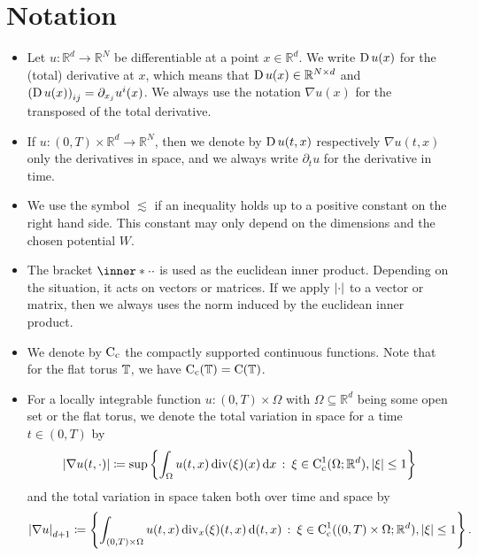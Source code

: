 \chapter{Notation}


	\begin{itemize}[leftmargin=*]
		\item	
		Let $ u \colon \mathbb{ R }^{ d } \to \mathbb{ R }^{ N } $ be 
		differentiable at a point $ x \in \mathbb{ R }^{d } $. We write $ \operatorname{D} 
		u ( x ) $ for the (total) derivative at $ x $, which means that
		$ \operatorname{D} u ( x ) \in \mathbb{ R }^{ N \times d } $ and
		$ \left( \operatorname{D} u ( x ) \right)_{ i j } = \partial_{ x_{ j } } u^{ i } ( 
		x ) $. We always use the notation $ \nabla u ( x ) $ for the transposed 
		of the total derivative. 
		
		\item
		If $ u \colon ( 0 , T ) \times \mathbb{ R }^{ d } \to \mathbb{ R 
		}^{ N } $, then we denote by $ \operatorname{D} u (t, x ) $  respectively $ \nabla 
		u ( 
		t,  x ) $ only the derivatives in space, and we always write $ 
		\partial_{ 
		t } u $ for the derivative in time.
	
		\item
		We use the symbol $ \lesssim $ if an inequality holds up to a positive 
		constant on the right hand side. This constant may only depend on the 
		dimensions and the chosen potential $ W $.
		
		\item 
		The bracket $ \inner*{\cdot}{\cdot} $ is used as the euclidean inner 
		product. Depending on the situation, it acts on vectors or matrices.
		If we apply $ \abs{ \cdot } $ to a vector or matrix, then we always 
		uses the norm induced by the euclidean inner product.
		
		\item 
		We denote by $ \operatorname{C}_{ \mathrm{c} } $ the compactly supported 
		continuous functions. Note that for the flat torus $ \operatorname{\mathbb{T}} $, we 
		have $ \operatorname{C}_{ \mathrm{c} } ( \operatorname{\mathbb{T}} ) = \operatorname{C} ( \operatorname{\mathbb{T}} ) $.
		
		\item
		For a locally integrable function $ u \colon ( 0 , T ) \times \Omega $ 
		with $ \Omega \subseteq \mathbb{ R }^{ d } $ being some open set or the 
		flat torus, we denote the total variation in space for a time $ t \in ( 
		0 , T ) $ by
		\begin{equation*}
			\abs{ \nabla u ( t , \cdot ) }
			\coloneqq
			\sup 
			\left\{
				\int_{ \Omega }
					u ( t , x ) \operatorname{div} ( \xi ) ( x ) 
				\dd{ x }
				\, \colon \,
				\xi \in \operatorname{C}_{ \mathrm{c} }^{ 1 } ( \Omega ; \mathbb{ R }^{ d 
				} ) , \abs{ \xi } \leq 1
			\right\}
		\end{equation*}	
		and the total variation in space taken both over time and space by
		\begin{equation*}
			\abs{ \nabla u }_{ d + 1 }
			\coloneqq
			\left\{
			\int_{ ( 0 , T ) \times \Omega }
			u ( t , x ) \operatorname{div}_{ x } ( \xi ) (t , x ) 
			\dd{ ( t, x ) }
			\, \colon \,
			\xi \in \operatorname{C}_{ \mathrm{c} }^{ 1 } (( 0 , T ) \times \Omega ; 
			\mathbb{ R }^{ d 
			} ) , \abs{ \xi } \leq 1
			\right\}.
		\end{equation*}
	

\end{itemize}
